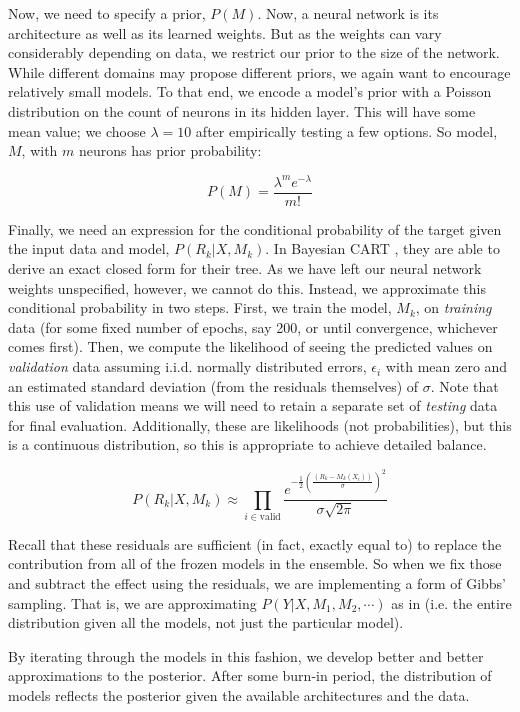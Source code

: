 \documentclass[12pt]{article}
\begin{document}
Now, we need to specify a prior, $P(M)$.  Now, a neural network is its architecture as well as its learned weights.  But as the weights can vary considerably depending on data, we restrict our prior to the size of the network.  While different domains may propose different priors, we again want to encourage relatively small models.  To that end, we encode a model's prior with a Poisson distribution on the count of neurons in its hidden layer.  This will have some mean value; we choose $\lambda=10$ after empirically testing a few options.  So model, $M$, with $m$ neurons has prior probability:

$$
P(M) = \frac{\lambda^m e^{-\lambda}}{m!}
$$

Finally, we need an expression for the conditional probability of the target given the input data and model, $P(R_k|X,M_k)$.  In Bayesian CART \cite{chipman1998bayesian}, they are able to derive an exact closed form for their tree.  As we have left our neural network weights unspecified, however, we cannot do this.  Instead, we approximate this conditional probability in two steps.  First, we train the model, $M_k$, on \emph{training} data (for some fixed number of epochs, say 200, or until convergence, whichever comes first).  Then, we compute the likelihood of seeing the predicted values on \emph{validation} data assuming i.i.d. normally distributed errors, $\epsilon_i$ with mean zero and an estimated standard deviation (from the residuals themselves) of $\sigma$.  Note that this use of validation means we will need to retain a separate set of \emph{testing} data for final evaluation.  Additionally, these are likelihoods (not probabilities), but this is a continuous distribution, so this is appropriate to achieve detailed balance.

$$
P(R_k|X,M_k) \approx \prod_{i \in \text{valid}} \frac{e^{-\frac{1}{2}\left(\frac{(R_k-M_k(X_i))}{\sigma}\right)^2}}{\sigma \sqrt{2\pi}}
$$

Recall that these residuals are sufficient (in fact, exactly equal to) to replace the contribution from all of the frozen models in the ensemble.  So when we fix those and subtract the effect using the residuals, we are implementing a form of Gibbs' sampling.  That is, we are approximating $P(Y|X,M_1,M_2,\cdots)$ as in \cite{chipman2010bart} (i.e. the entire distribution given all the models, not just the particular model).  

By iterating through the models in this fashion, we develop better and better approximations to the posterior.  After some burn-in period, the distribution of models reflects the posterior given the available architectures and the data.
\end{document}
